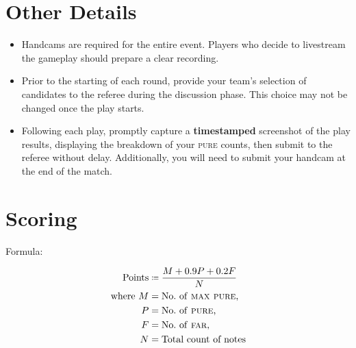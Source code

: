 \documentclass{article}
\newcommand{\scoreformula}[1]{{\color{red} #1}}
\newcommand{\notestyle}[1]{\textsc{\lowercase {#1}}}
\newcommand\Points{\text{Points}}
\newcommand\MaxPure{\notestyle{Max Pure}}
\newcommand\Pure{\notestyle{Pure}}
\newcommand\Far{\notestyle{Far}}
\newcommand{\coloneq}{\mathrel{\resizebox{\widthof{$\mathord{=}$}}{\height}{ $\!\!\resizebox{1.2\width}{0.8\height}{\raisebox{0.23ex}{$\mathop{:}$}}\!\!=\!\!$ }}}
\begin{document}
\section{Other Details}

\begin{itemize}

	\item Handcams are required for the entire event.
	      Players who decide to livestream the gameplay
	      should prepare a clear recording.

	\item Prior to the starting of each round,
	      provide your team's selection of candidates
	      to the referee during the discussion phase.
	      This choice may not be changed once the play starts.

	\item Following each play, promptly capture a \textbf{timestamped} screenshot
	      of the play results, displaying the breakdown of your \Pure{} counts, then
	      submit to the referee without delay. Additionally, you will need to
	      submit your handcam at the end of the match.

\end{itemize}

\section{Scoring}

Formula:

\scoreformula{
	\begin{align*}
		\Points        & \coloneq \frac{M + 0.9P + 0.2F}{N} \\
		\text{where}~M & = \text{No.~of \MaxPure,}          \\
		P              & = \text{No.~of \Pure,}             \\
		F              & = \text{No.~of \Far,}              \\
		N              & = \text{Total count of notes}
	\end{align*}
}
\end{document}
